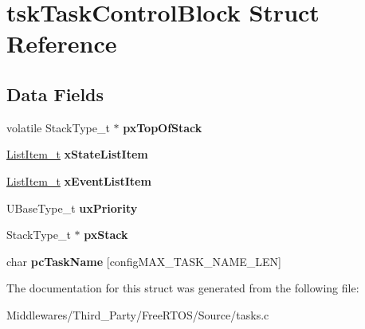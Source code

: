 \hypertarget{structtsk_task_control_block}{}\section{tsk\+Task\+Control\+Block Struct Reference}
\label{structtsk_task_control_block}
\subsection*{Data Fields}
\begin{DoxyCompactItemize}
\item 
\mbox{\label{structtsk_task_control_block_a41989bc39d576125f4492364592f9e1a}} 
volatile Stack\+Type\+\_\+t $\ast$ {\bfseries px\+Top\+Of\+Stack}
\item 
\mbox{\label{structtsk_task_control_block_a2575f6a579ef61db0db66d7b1b52ec48}} 
\mbox{\hyperlink{structx_l_i_s_t___i_t_e_m}{List\+Item\+\_\+t}} {\bfseries x\+State\+List\+Item}
\item 
\mbox{\label{structtsk_task_control_block_a139605d93d834601f34be927ecba3a15}} 
\mbox{\hyperlink{structx_l_i_s_t___i_t_e_m}{List\+Item\+\_\+t}} {\bfseries x\+Event\+List\+Item}
\item 
\mbox{\label{structtsk_task_control_block_a0befed3dd0fe55b4314158f4814f50ae}} 
U\+Base\+Type\+\_\+t {\bfseries ux\+Priority}
\item 
\mbox{\label{structtsk_task_control_block_aaecd48bdf732c1df94b258956ca85bd7}} 
Stack\+Type\+\_\+t $\ast$ {\bfseries px\+Stack}
\item 
\mbox{\label{structtsk_task_control_block_afa7d65deeca135b921eaa78fbbf52918}} 
char {\bfseries pc\+Task\+Name} \mbox{[}config\+M\+A\+X\+\_\+\+T\+A\+S\+K\+\_\+\+N\+A\+M\+E\+\_\+\+L\+EN\mbox{]}
\end{DoxyCompactItemize}


The documentation for this struct was generated from the following file\+:\begin{DoxyCompactItemize}
\item 
Middlewares/\+Third\+\_\+\+Party/\+Free\+R\+T\+O\+S/\+Source/tasks.\+c\end{DoxyCompactItemize}
